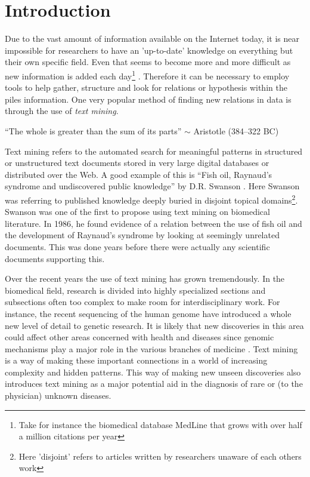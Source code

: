 \chapter{Introduction\label{Introduction}}

Due to the vast amount of information available on the Internet today,
it is near impossible for researchers to have an 'up-to-date'
knowledge on everything but their own specific field. Even that seems
to become more and more difficult as new information is added each
day\footnote{Take for instance the biomedical database MedLine that
  grows with over half a million citations per year}
\cite{CitAddMedLine}. Therefore it can be necessary to employ tools to
help gather, structure and look for relations or hypothesis within the
piles information. One very popular method of finding new relations in
data is through the use of \textit{text mining}.

\begin{center}
{\small``The whole is greater than the sum of its parts'' $\sim$ Aristotle
(384--322 BC)} 
\end{center}

Text mining refers to the automated search for meaningful patterns in
structured or unstructured text documents stored in very large digital
databases or distributed over the Web. A good example of this is
``Fish oil, Raynaud's syndrome and undiscovered public knowledge'' by
D.R. Swanson \cite{DRSwanson}. Here Swanson was referring to published
knowledge deeply buried in disjoint topical domains\footnote{Here
  'disjoint' refers to articles written by researchers unaware of each
  others work}. Swanson was one of the first to propose using text
mining on biomedical literature. In 1986, he found evidence of a
relation between the use of fish oil and the development of Raynaud's
syndrome by looking at seemingly unrelated documents. This was done
years before there were actually any scientific documents supporting
this.

Over the recent years the use of text mining has grown
tremendously. In the biomedical field, research is divided into highly
specialized sections and subsections often too complex to make room
for interdisciplinary work. For instance, the recent sequencing of the
human genome have introduced a whole new level of detail to genetic
research. It is likely that new discoveries in this area could affect
other areas concerned with health and diseases since genomic
mechanisms play a major role in the various branches of medicine
\cite{survey.biomed.text.cohen.2005}. Text mining is a way of making
these important connections in a world of increasing complexity and
hidden patterns. This way of making new unseen discoveries also
introduces text mining as a major potential aid in the diagnosis of
rare or (to the physician) unknown diseases.

